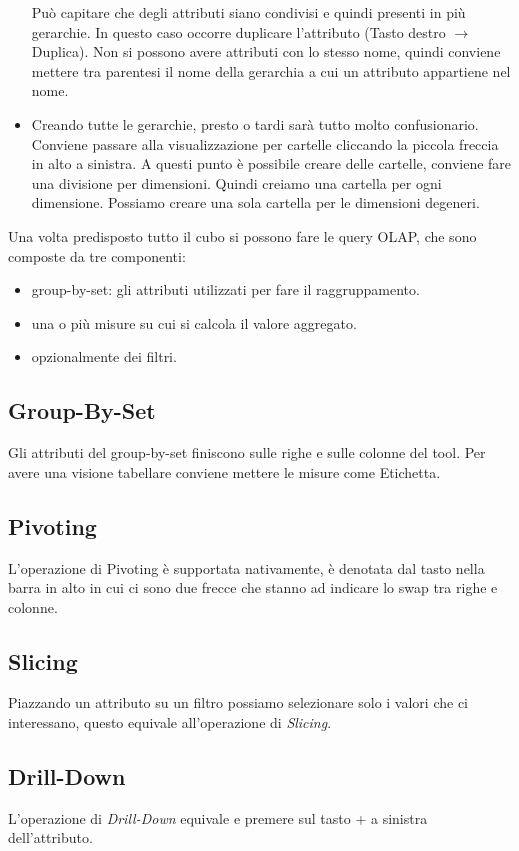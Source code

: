 \begin{itemize}
	Può capitare che degli attributi siano condivisi e quindi presenti in più gerarchie. In questo caso occorre duplicare l'attributo (Tasto destro $\xrightarrow{}$ Duplica). Non si possono avere attributi con lo stesso nome, quindi conviene mettere tra parentesi il nome della gerarchia a cui un attributo appartiene nel nome.\newline
	\item Creando tutte le gerarchie, presto o tardi sarà tutto molto confusionario. Conviene passare alla visualizzazione per cartelle cliccando la piccola freccia in alto a sinistra. A questi punto è possibile creare delle cartelle, conviene fare una divisione per dimensioni. Quindi creiamo una cartella per ogni dimensione. Possiamo creare una sola cartella per le dimensioni degeneri.
\end{itemize}
Una volta predisposto tutto il cubo si possono fare le query OLAP, che sono composte da tre componenti:
\begin{itemize}
	\item group-by-set: gli attributi utilizzati per fare il raggruppamento.
	\item una o più misure su cui si calcola il valore aggregato.
	\item opzionalmente dei filtri.
\end{itemize}
\subsection{Group-By-Set}
Gli attributi del group-by-set finiscono sulle righe e sulle colonne del tool. Per avere una visione tabellare conviene mettere le misure come Etichetta. 
\subsection{Pivoting}
L'operazione di Pivoting è supportata nativamente, è denotata dal tasto nella barra in alto in cui ci sono due frecce che stanno ad indicare lo swap tra righe e colonne.
\subsection{Slicing}
Piazzando un attributo su un filtro possiamo selezionare solo i valori che ci interessano, questo equivale all'operazione di \textit{Slicing}.\newline 
\subsection{Drill-Down}
L'operazione di \textit{Drill-Down} equivale e premere sul tasto + a sinistra dell'attributo.
